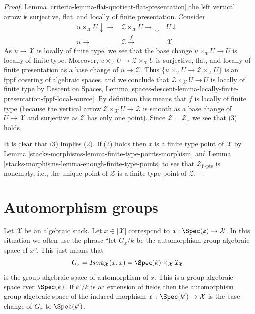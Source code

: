 \begin{proof}
Lemma \ref{criteria-lemma-flat-quotient-flat-presentation}
the left vertical arrow is surjective, flat, and locally of finite
presentation. Consider
$$
\begin{array}{ccc}u \times_\mathcal{X} U \downarrow\longrightarrow & \mathcal{Z} \times_\mathcal{X} U \longrightarrow\downarrow & U \downarrow \\ u \longrightarrow & \mathcal{Z} \overset{f}{\longrightarrow} & \mathcal{X}\end{array}
$$
As $u \to \mathcal{X}$ is locally of finite type, we see that the base change
$u \times_\mathcal{X} U \to U$ is locally of finite type. Moreover,
$u \times_\mathcal{X} U \to \mathcal{Z} \times_\mathcal{X} U$ is
surjective, flat, and locally of finite presentation as a base change of
$u \to \mathcal{Z}$. Thus
$\{u \times_\mathcal{X} U \to \mathcal{Z} \times_\mathcal{X} U\}$
is an fppf covering of algebraic spaces, and we conclude that
$\mathcal{Z} \times_\mathcal{X} U \to U$ is locally of finite type by
Descent on Spaces, Lemma
\ref{spaces-descent-lemma-locally-finite-presentation-fppf-local-source}.
By definition this means that $f$ is locally of finite type (because the
vertical arrow $\mathcal{Z} \times_\mathcal{X} U \to \mathcal{Z}$ is smooth
as a base change of $U \to \mathcal{X}$ and surjective as $\mathcal{Z}$ has
only one point). Since $\mathcal{Z} = \mathcal{Z}_x$ we see that (3) holds.

\medskip\noindent
It is clear that (3) implies (2).
If (2) holds then $x$ is a finite type point of $\mathcal{X}$ by
Lemma \ref{stacks-morphisms-lemma-finite-type-points-morphism}
and
Lemma \ref{stacks-morphisms-lemma-enough-finite-type-points}
to see that $\mathcal{Z}_{\text{ft-pts}}$ is nonempty, i.e., the
unique point of $\mathcal{Z}$ is a finite type point of $\mathcal{Z}$.
\end{proof}

\section{Automorphism groups}
\label{stacks-morphisms-section-automorphism-groups}
Let $\mathcal{X}$ be an algebraic stack. Let $x \in |\mathcal{X}|$
correspond to $x : \Spec(k) \to \mathcal{X}$. In this situation we
often use the phrase
``let $G_x/k$ be the automorphism group algebraic space of $x$''.
This just means that
$$
G_x = \mathit{Isom}_\mathcal{X}(x, x) =
\Spec(k) \times_\mathcal{X} \mathcal{I}_\mathcal{X}
$$
is the group algebraic space of automorphism of $x$. This is a
group algebraic space over $\Spec(k)$. If $k'/k$ is an extension of fields
then the automorphism group algebraic space of the induced morphism
$x' : \Spec(k') \to \mathcal{X}$ is the base change of $G_x$
to $\Spec(k')$.

